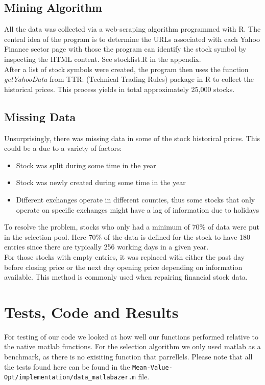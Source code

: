 \documentclass[12pt,titlepage,a4paper]{article}
\begin{document}
\subsection{Mining Algorithm}
All the data was collected via a web-scraping algorithm programmed with R. The central idea of the program is to determine the URLs associated with each Yahoo Finance sector page with those the program can identify the stock symbol by inspecting the HTML content. See stocklist.R in the appendix.\\

After a list of stock symbols were created, the program then uses the function \textit{getYahooData} from TTR: (Technical Trading Rules) package in R to collect the historical prices. This process yields in total approximately 25,000 stocks. 
\subsection{Missing Data}
Unsurprisingly, there was missing data in some of the stock historical prices. This could be a due to a variety of factors: 
\begin{itemize}
\item Stock was split during some time in the year
\item Stock was newly created during some time in the year
\item Different exchanges operate in different counties, thus some stocks that only operate on specific exchanges might have a lag of information due to holidays
\end{itemize}

To resolve the problem, stocks who only had a minimum of 70\% of data were put in the selection pool. Here 70\% of the data is defined for the stock to have 180 entries since there are typically 256 working days in a given year.\\

For those stocks with empty entries, it was replaced with either the past day before closing price or the next day opening price depending on information available. This method is commonly used when repairing financial stock data.  


\section{Tests, Code and Results}

\begin{par}
For testing of our code we looked at how well our functions performed relative to the native matlab functions. For the selection algorithm we only used matlab as a benchmark, as there is no exisiting function that parrellels. Please note that all the tests found here can be found in the \texttt{Mean-Value-Opt/implementation/data\_matlabazer.m} file.
\end{par} \vspace{1em}
\end{document}
